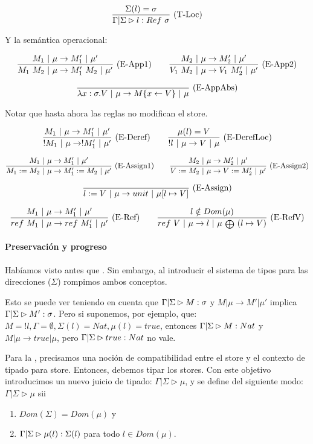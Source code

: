 \[\frac{\Sigma(l) = \sigma}{\Gamma|\Sigma \rhd l : Ref\ \sigma}\ \text{(T-Loc)}\]

Y la semántica operacional:

\[\frac{M_1 \ |\  \mu \to M_1' \ |\  \mu'}{M_1\ M_2 \ |\  \mu \to M_1'\ M_2 \ |\  \mu'}\ \text{(E-App1)}\quad\quad \frac{M_2 \ |\  \mu \to M_2' \ |\  \mu'}{V_1\ M_2 \ |\  \mu \to V_1\ M_2' \ |\  \mu'}\ \text{(E-App2)}\]

\[\frac{}{\lambda x:\sigma.V \ |\  \mu \to M\{x \leftarrow V\} \ |\  \mu}\ \text{(E-AppAbs)}\]

Notar que hasta ahora las reglas no modifican el store.

\[\frac{M_1 \ |\  \mu \to M_1' \ |\  \mu'}{!M_1 \ |\  \mu \to !M_1' \ |\  \mu'}\ \text{(E-Deref)}\quad\quad \frac{\mu(l) = V}{!l \ |\  \mu \to V \ |\  \mu}\ \text{(E-DerefLoc)}\]

\[\frac{M_1 \ |\  \mu \to M_1' \ |\  \mu'}{M_1 := M_2 \ |\  \mu \to M_1' := M_2 \ |\  \mu'}\ \text{(E-Assign1)}\quad\quad \frac{M_2 \ |\  \mu \to M_2' \ |\  \mu'}{V := M_2 \ |\  \mu \to V := M_2' \ |\  \mu'}\ \text{(E-Assign2)}\]

\[\frac{}{l := V \ |\  \mu \to unit \ |\  \mu[l \mapsto V]}\ \text{(E-Assign)}\]

\[\deriv{M_1 \vert \mu \to M_1' \vert \mu'}{ref\ M_1 \vert \mu \to ref\ M_1' \vert \mu'}{E-Ref}\quad\quad \deriv{l \notin Dom(\mu)}{ref\ V \vert \mu \to l \vert \mu\ {\scriptstyle \medoplus}\ (l \mapsto V)}{E-RefV}\]

\paragraph{Preservación y progreso}

Habíamos visto antes que . Sin embargo, al introducir el sistema de tipos para las direcciones ($\Sigma$) rompimos ambos conceptos.

Esto se puede ver teniendo en cuenta que $\Gamma|\Sigma \rhd M : \sigma$ y $M \vert \mu \to M' \vert \mu'$ implica $\Gamma|\Sigma \rhd M' : \sigma$. Pero si suponemos, por ejemplo, que: $M = !l, \Gamma = \emptyset, \Sigma(l) = Nat, \mu(l) = true$, entonces $\Gamma|\Sigma \rhd M : Nat$ y $M \vert \mu \to true \vert \mu$, pero $\Gamma|\Sigma \rhd true : Nat$ no vale.

Para la , precisamos una noción de compatibilidad entre el store y el contexto de tipado para store. Entonces, debemos tipar los stores. Con este objetivo introducimos un nuevo juicio de tipado: $\Gamma|\Sigma \rhd \mu$, y se define del siguiente modo: $\Gamma|\Sigma \rhd \mu$ sii
\begin{enumerate}
  \item $Dom(\Sigma) = Dom(\mu)$ y
  \item $\Gamma|\Sigma \rhd \mu(l) : \Sigma(l)$ para todo $l \in Dom(\mu)$.
\end{enumerate}

